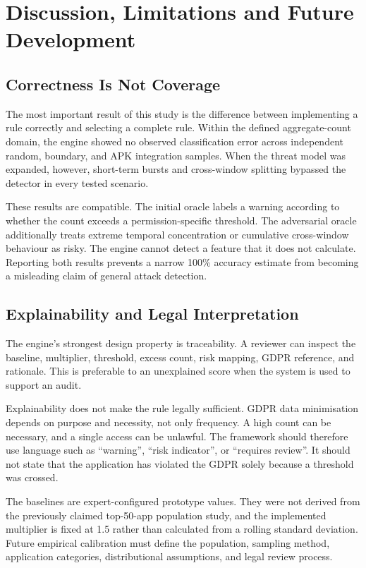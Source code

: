 \newpage
\section{Discussion, Limitations and Future Development}

\subsection{Correctness Is Not Coverage}

The most important result of this study is the difference between implementing a rule correctly and selecting a complete rule. Within the defined aggregate-count domain, the engine showed no observed classification error across independent random, boundary, and APK integration samples. When the threat model was expanded, however, short-term bursts and cross-window splitting bypassed the detector in every tested scenario.

These results are compatible. The initial oracle labels a warning according to whether the count exceeds a permission-specific threshold. The adversarial oracle additionally treats extreme temporal concentration or cumulative cross-window behaviour as risky. The engine cannot detect a feature that it does not calculate. Reporting both results prevents a narrow 100\% accuracy estimate from becoming a misleading claim of general attack detection.

\subsection{Explainability and Legal Interpretation}

The engine's strongest design property is traceability. A reviewer can inspect the baseline, multiplier, threshold, excess count, risk mapping, GDPR reference, and rationale. This is preferable to an unexplained score when the system is used to support an audit.

Explainability does not make the rule legally sufficient. GDPR data minimisation depends on purpose and necessity, not only frequency. A high count can be necessary, and a single access can be unlawful. The framework should therefore use language such as ``warning'', ``risk indicator'', or ``requires review''. It should not state that the application has violated the GDPR solely because a threshold was crossed.

The baselines are expert-configured prototype values. They were not derived from the previously claimed top-50-app population study, and the implemented multiplier is fixed at 1.5 rather than calculated from a rolling standard deviation. Future empirical calibration must define the population, sampling method, application categories, distributional assumptions, and legal review process.

